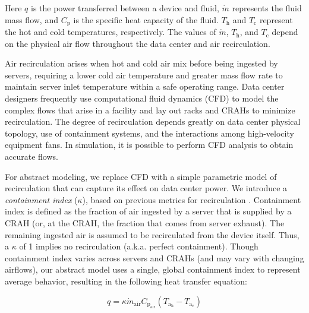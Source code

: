 Here $q$ is the power transferred between a device and fluid, $\dot{m}$ represents the fluid mass flow, and $C_{\mathrm{p}}$ is the specific heat capacity of the fluid.
$T_{\mathrm{h}}$ and $T_{\mathrm{c}}$ represent the hot and cold temperatures, respectively.
The values of $\dot{m}$, $T_{\mathrm{h}}$, and $T_{\mathrm{c}}$ depend on the physical air flow throughout the data center and air recirculation.

Air recirculation arises when hot and cold air mix before being ingested by servers, requiring a lower cold air temperature and greater mass flow rate to maintain server inlet temperature within a safe operating range.
Data center designers frequently use computational fluid dynamics (CFD) to model the complex flows that arise in a facility and lay out racks and CRAHs to minimize recirculation.  The degree of recirculation depends greatly on data center physical topology, use of containment systems, and the interactions among high-velocity equipment fans.  In  simulation, it is possible to perform CFD analysis to obtain accurate flows. 

For abstract modeling, we replace CFD with a simple parametric model of recirculation that can capture its effect on data center power.  We introduce a \emph{containment index} ($\kappa$), based on previous metrics for recirculation \cite{Tozer09, VanGilder07}.
Containment index is defined as the fraction of air ingested by a server that is supplied by a CRAH (or, at the CRAH, the fraction that comes from server exhaust).
The remaining ingested air is assumed to be recirculated from the device itself.
Thus, a $\kappa$ of 1 implies no recirculation (a.k.a. perfect containment).
Though containment index varies across servers and CRAHs (and may vary with changing airflows), our abstract model uses a single, global containment index to represent average behavior, resulting in the following heat transfer equation:

\begin{equation}
q  = \kappa \dot{m}_{\mathrm{air}} C_{\mathrm{p}_{\mathrm{air}}} ( T_{\mathrm{a}_\mathrm{h}} - T_{\mathrm{a}_\mathrm{c}})
\label{equation::HeatTransfer}
\end{equation}

